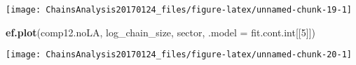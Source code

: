 \documentclass[]{article}
\newenvironment{Shaded}{\begin{snugshade}}{\end{snugshade}}
\newcommand{\KeywordTok}[1]{\textcolor[rgb]{0.13,0.29,0.53}{\textbf{{#1}}}}
\newcommand{\DataTypeTok}[1]{\textcolor[rgb]{0.13,0.29,0.53}{{#1}}}
\newcommand{\DecValTok}[1]{\textcolor[rgb]{0.00,0.00,0.81}{{#1}}}
\newcommand{\NormalTok}[1]{{#1}}
\begin{document}
\begin{center}\texttt{[image: ChainsAnalysis20170124\_files/figure-latex/unnamed-chunk-19-1]} \end{center}

\begin{Shaded}
\begin{Highlighting}[]
\KeywordTok{ef.plot}\NormalTok{(comp12.noLA, log_chain_size, sector, }\DataTypeTok{.model =} \NormalTok{fit.cont.int[[}\DecValTok{5}\NormalTok{]])}
\end{Highlighting}
\end{Shaded}

\begin{center}\texttt{[image: ChainsAnalysis20170124\_files/figure-latex/unnamed-chunk-20-1]} \end{center}
\end{document}
